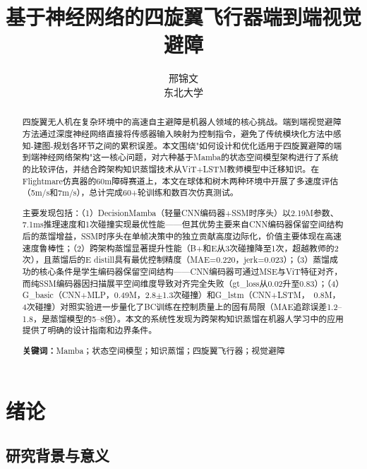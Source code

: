 \documentclass[12pt,a4paper]{article}
\title{基于神经网络的四旋翼飞行器端到端视觉避障}
\author{邢锦文\\东北大学}
\date{}
\makeatletter
\numberwithin{equation}{section}
\numberwithin{figure}{section}
\numberwithin{table}{section}
\newcommand{\cleardoublepage}{\clearpage\if@twoside\ifodd\c@page\else\hbox{}\thispagestyle{empty}\newpage\if@twocolumn\hbox{}\newpage\fi\fi\fi}%
\makeatother
\begin{document}
\maketitle

\begin{abstract}
四旋翼无人机在复杂环境中的高速自主避障是机器人领域的核心挑战。端到端视觉避障方法通过深度神经网络直接将传感器输入映射为控制指令，避免了传统模块化方法中感知-建图-规划各环节之间的累积误差。本文围绕"如何设计和优化适用于四旋翼避障的端到端神经网络架构"这一核心问题，对六种基于Mamba的状态空间模型架构进行了系统的比较评估，并结合跨架构知识蒸馏技术从ViT+LSTM教师模型中迁移知识。在Flightmare仿真器的60m障碍赛道上，本文在球体和树木两种环境中开展了多速度评估（5m/s和7m/s），总计完成60+轮训练和数百次仿真测试。

主要发现包括：（1）DecisionMamba（轻量CNN编码器+SSM时序头）以2.19M参数、7.1ms推理速度和1次碰撞实现最优性能——但其优势主要来自CNN编码器保留空间结构后的蒸馏增益，SSM时序头在单帧决策中的独立贡献高度边际化，价值主要体现在高速速度鲁棒性；（2）跨架构蒸馏显著提升性能（B+和E从3次碰撞降至1次，超越教师的2次），且蒸馏后的E distill具有最优控制精度（MAE=0.220，jerk=0.023）；（3）蒸馏成功的核心条件是学生编码器保留空间结构——CNN编码器可通过MSE与ViT特征对齐，而纯SSM编码器因扫描展平空间维度导致对齐完全失败（gt\_loss从0.02升至0.83）；（4）G\_basic（CNN+MLP，0.49M，2.8$\pm$1.3次碰撞）和G\_lstm（CNN+LSTM，~0.8M，4次碰撞）对照实验进一步量化了BC训练在控制质量上的固有局限（MAE追踪误差1.2--1.8，是蒸馏模型的5--8倍）。本文的系统性发现为跨架构知识蒸馏在机器人学习中的应用提供了明确的设计指南和边界条件。

\textbf{关键词：}Mamba；状态空间模型；知识蒸馏；四旋翼飞行器；视觉避障
\end{abstract}
\clearpage
{}
\setcounter{page}{1}
\tableofcontents
\newpage
\listoffigures
\newpage
\listoftables
\newpage
{}
\setcounter{page}{1}

\cleardoublepage
\section{绪论}

\subsection{研究背景与意义}
\end{document}

